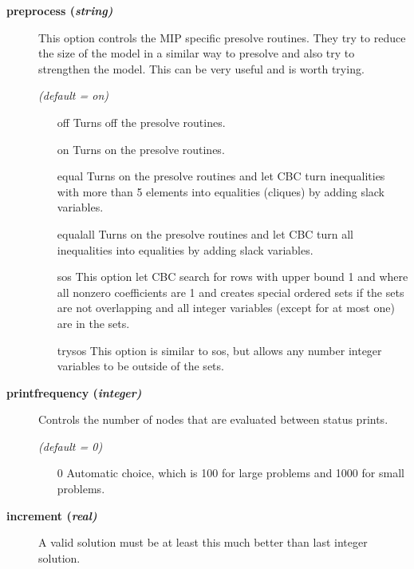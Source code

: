 \begin{description}
\item[\label{preprocess}\hypertarget{preprocess}
{\textbf{preprocess (\slshape{string})}}]\hspace{1.0in}

This option controls the MIP specific presolve routines.
They try to reduce the size of the model in a similar way to presolve and also try to strengthen the model.
This can be very useful and is worth trying.

\textsl{(default = on)}
\begin{itemize}
\item[off] 
Turns off the presolve routines.
\item[on] 
Turns on the presolve routines.
\item[equal] 
Turns on the presolve routines and let CBC turn inequalities with more than 5 elements into equalities (cliques) by adding slack variables.
\item[equalall] 
Turns on the presolve routines and let CBC turn all inequalities into equalities by adding slack variables.
\item[sos] 
This option let CBC search for rows with upper bound 1 and where all nonzero coefficients are 1 and creates special ordered sets if the sets are not overlapping and all integer variables (except for at most one) are in the sets.
\item[trysos] 
This option is similar to sos, but allows any number integer variables to be outside of the sets.
\end{itemize}

\item[\label{printfrequency}\hypertarget{printfrequency}
{\textbf{printfrequency (\slshape{integer})}}]\hspace{1.0in}

Controls the number of nodes that are evaluated between status prints.

\textsl{(default = 0)}
\begin{itemize}
\item[0] 
Automatic choice, which is 100 for large problems and 1000 for small problems.
\end{itemize}

\item[\label{increment}\hypertarget{increment}
{\textbf{increment (\slshape{real})}}]\hspace{1.0in}

A valid solution must be at least this much better than last integer solution.


\end{description}
